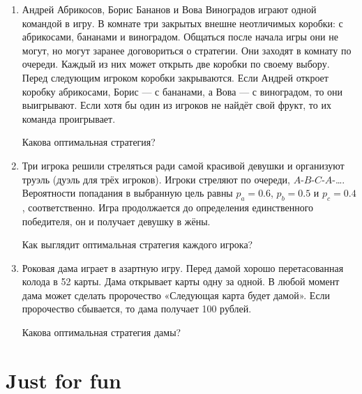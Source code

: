 \documentclass[12pt]{article}
\theoremstyle{definition}
\begin{document}
\begin{enumerate}
  \item Андрей Абрикосов, Борис Бананов и Вова Виноградов играют одной командой в игру.
  В комнате три закрытых внешне неотличимых коробки: с абрикосами, бананами и виноградом.
  Общаться после начала игры они не могут, но могут заранее договориться о стратегии.
  Они заходят в комнату по очереди.
  Каждый из них может открыть две коробки по своему выбору.
  Перед следующим игроком коробки закрываются. Если Андрей откроет коробку абрикосами,
  Борис — с бананами, а Вова — с виноградом, то они выигрывают.
  Если хотя бы один из игроков не найдёт свой фрукт, то их команда проигрывает.
  
Какова оптимальная стратегия?
  \item Три игрока решили стреляться ради самой красивой девушки и организуют труэль
  (дуэль для трёх игроков).  Игроки стреляют по очереди, $A$-$B$-$C$-$A$-\ldots.
  Вероятности попадания в выбранную цель равны $p_a=0.6$, $p_b=0.5$ и $p_c=0.4$, соответственно.
  Игра продолжается до определения единственного победителя,
  он и получает девушку в жёны.
  
  Как выглядит оптимальная стратегия каждого игрока?
  \item Роковая дама играет в азартную игру.
  Перед дамой хорошо перетасованная колода в 52 карты.
  Дама открывает карты одну за одной. В любой момент дама может
  сделать пророчество «Следующая карта будет дамой».
  Если пророчество сбывается, то дама получает 100 рублей.
  
 Какова оптимальная стратегия дамы?
  
  



\end{enumerate}
\newpage
\section{Just for fun}
\newpage
\end{document}
